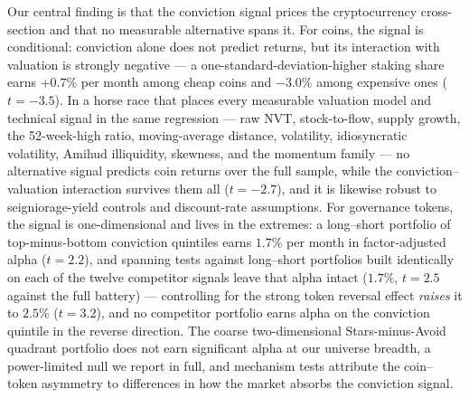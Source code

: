 \documentclass[12pt]{article}
\begin{document}
Our central finding is that the conviction signal prices the cryptocurrency
cross-section and that no measurable alternative spans it. For coins, the signal is
conditional: conviction alone does not predict returns, but its interaction with
valuation is strongly negative --- a one-standard-deviation-higher staking share earns
$+0.7\%$ per month among cheap coins and $-3.0\%$ among expensive ones ($t=-3.5$). In
a horse race that places every measurable valuation model and technical signal in the
same regression --- raw NVT, stock-to-flow, supply growth, the 52-week-high ratio,
moving-average distance, volatility, idiosyncratic volatility, Amihud illiquidity,
skewness, and the momentum family --- no alternative signal predicts coin returns over
the full sample, while the conviction--valuation interaction survives them all
($t=-2.7$), and it is likewise robust to seigniorage-yield controls and discount-rate
assumptions. For governance tokens, the signal is one-dimensional and lives in the
extremes: a long--short portfolio of top-minus-bottom conviction quintiles earns
$1.7\%$ per month in factor-adjusted alpha ($t=2.2$), and spanning tests against
long--short portfolios built identically on each of the twelve competitor signals
leave that alpha intact ($1.7\%$, $t=2.5$ against the full battery) --- controlling
for the strong token reversal effect \textit{raises} it to $2.5\%$ ($t=3.2$), and no
competitor portfolio earns alpha on the conviction quintile in the reverse direction.
The coarse two-dimensional Stars-minus-Avoid quadrant portfolio does not earn
significant alpha at our universe breadth, a power-limited null we report in full, and mechanism tests
attribute the coin--token asymmetry to differences in how the market absorbs the
conviction signal.
\end{document}
